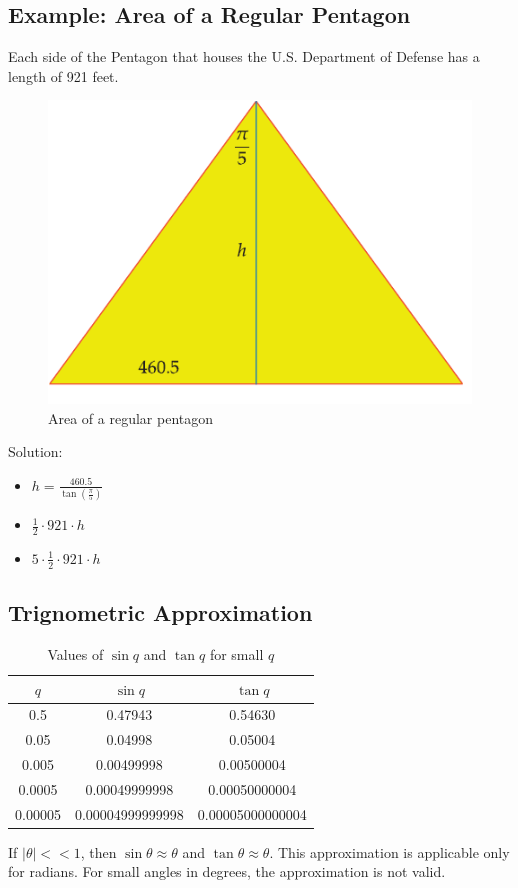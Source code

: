 \subsection{Example: Area of a Regular Pentagon}
Each side of the Pentagon that houses the U.S. Department of Defense has a length of 921 feet.
\begin{figure}
    \centering
    \includegraphics[scale=0.3]{pics/29.png}
    \caption{Area of a regular pentagon}
\end{figure}
Solution:
\begin{itemize}
    \item $h = \frac{460.5}{\tan (\frac{\pi}{5})}$
    \item $\frac{1}{2} \cdot 921 \cdot h$
    \item $5 \cdot \frac{1}{2} \cdot 921 \cdot h$
\end{itemize}

\subsection{Trignometric Approximation}
\begin{table}[h]
    \centering
    \begin{tabular}{|c|c|c|}
        \hline
        $q$ & $\sin q$ & $\tan q$ \\
        \hline
        0.5 & 0.47943 & 0.54630 \\
        0.05 & 0.04998 & 0.05004 \\
        0.005 & 0.00499998 & 0.00500004 \\
        0.0005 & 0.00049999998 & 0.00050000004 \\
        0.00005 & 0.00004999999998 & 0.00005000000004 \\
        \hline
    \end{tabular}
    \caption{Values of $\sin q$ and $\tan q$ for small $q$}
\end{table}
If $| \theta | << 1$, then $\sin \theta \approx \theta$ and $\tan \theta \approx \theta$.
This approximation is applicable only for radians. For small angles in degrees, the approximation is not valid.

